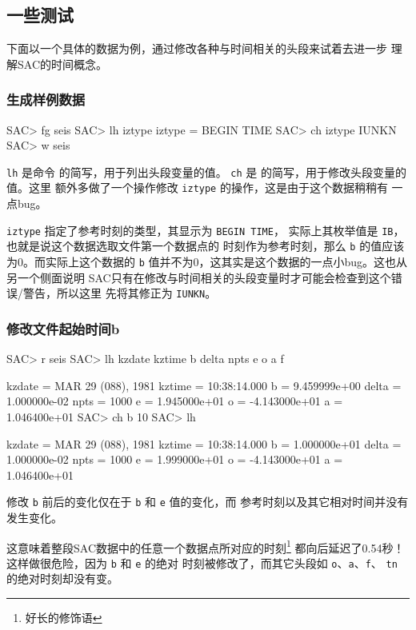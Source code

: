 \subsection{一些测试}
下面以一个具体的数据为例，通过修改各种与时间相关的头段来试着去进一步
理解SAC的时间概念。

\subsubsection{生成样例数据}
\begin{SACCode}
SAC> fg seis
SAC> lh iztype
    iztype = BEGIN TIME
SAC> ch iztype IUNKN
SAC> w seis
\end{SACCode}
\texttt{lh} 是命令  的简写，用于列出头段变量的值。
\texttt{ch} 是  的简写，用于修改头段变量的值。这里
额外多做了一个操作修改 \texttt{iztype} 的操作，这是由于这个数据稍稍有
一点bug。

\texttt{iztype} 指定了参考时刻的类型，其显示为 \texttt{BEGIN TIME}，
实际上其枚举值是 \texttt{IB}，也就是说这个数据选取文件第一个数据点的
时刻作为参考时刻，那么 \texttt{b} 的值应该为0。而实际上这个数据的
\texttt{b} 值并不为0，这其实是这个数据的一点小bug。这也从另一个侧面说明
SAC只有在修改与时间相关的头段变量时才可能会检查到这个错误/警告，所以这里
先将其修正为 \texttt{IUNKN}。

\subsubsection{修改文件起始时间b}
\begin{SACCode}
SAC> r seis
SAC> lh kzdate kztime b delta npts e o a f

     kzdate = MAR 29 (088), 1981
     kztime = 10:38:14.000
          b = 9.459999e+00
      delta = 1.000000e-02
       npts = 1000
          e = 1.945000e+01
          o = -4.143000e+01
          a = 1.046400e+01
SAC> ch b 10
SAC> lh

     kzdate = MAR 29 (088), 1981
     kztime = 10:38:14.000
          b = 1.000000e+01
      delta = 1.000000e-02
       npts = 1000
          e = 1.999000e+01
          o = -4.143000e+01
          a = 1.046400e+01
\end{SACCode}

修改 \texttt{b} 前后的变化仅在于 \texttt{b} 和 \texttt{e} 值的变化，而
参考时刻以及其它相对时间并没有发生变化。

这意味着整段SAC数据中的任意一个数据点所对应的时刻\footnote{好长的修饰语}
都向后延迟了0.54秒！这样做很危险，因为 \texttt{b} 和 \texttt{e} 的绝对
时刻被修改了，而其它头段如 \texttt{o}、\texttt{a}、\texttt{f}、
\texttt{tn} 的绝对时刻却没有变。

